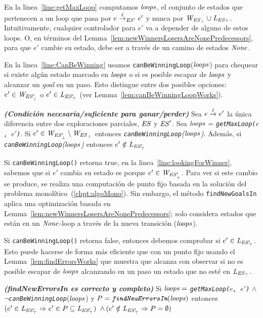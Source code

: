 En la linea~\ref{line:getMaxLoop} computamos $\mathit{loops}$, el conjunto de estados que pertenecen a un loop que pasa por $e \overset{\ell}{\rightarrow}_{\mathit{ES}'} e'$ y nunca por $\mathit{W_{\mathit{\mathit{ES}_{\bot}}}} \cup \mathit{L_{\mathit{\mathit{ES}_{\top}}}}$. 
Intuitivamente, cualquier controlador para $e'$ va a depender de alguno de estos loops. O, en términos del Lemma~\ref{lem:newWinnersLosersAreNonePredecessors}, para que $e'$ cambie su estado, debe ser a través de un camino de estados $\mathit{None}$. 

En la linea~\ref{line:CanBeWinning} usamos \texttt{canBeWinningLoop}($\mathit{loops}$) para chequear si existe algún estado marcado en $\mathit{loops}$ o si es posible escapar de $\mathit{loops}$ y alcanzar un \textit{goal} en un paso. Esto distingue entre dos posibles opciones: $e' \in \mathit{W_{\mathit{\mathit{ES}'_{\bot}}}}$ o $e' \in \mathit{L_{\mathit{\mathit{ES}'_{\top}}}}$ (ver 
Lemma~\ref{lem:canBeWinningLoopWorks}). 

\begin{lemma}\textbf{\emph{(Condición necesaria/suficiente para ganar/perder)}}
\label{lem:canBeWinningLoopWorks}
Sea $e \overset{\ell}{\rightarrow}_{} e'$ la única diferencia entre dos exploraciones parciales, 
$\mathit{ES}$ y $\mathit{ES}'$. Sea $\mathit{loops}$ = \emph{\texttt{getMaxLoop($e$, 
$e'$)}}.
Si $e' \in \mathit{W_{\mathit{\mathit{ES}'_{\bot}}}} \setminus \mathit{W_{\mathit{\mathit{ES}_{\bot}}}}$ 
entonces \emph{\texttt{canBeWinningLoop}($\mathit{loops}$)}. Además, si \\ 
\emph{\texttt{canBeWinningLoop}($\mathit{loops}$)} entonces $e' \notin \mathit{L_{\mathit{\mathit{ES}'_{\top}}}}$ 
\end{lemma}


Si \texttt{canBeWinningLoop()} retorna true, en la  linea~\ref{line:lookingForWinner}, 
sabemos que si $e'$ cambia su estado es porque $e' \in \mathit{W_{\mathit{\mathit{ES}'_{\bot}}}}$. Para ver si este cambio se produce, se realiza una computación de punto fijo basada en la solución del problema monolítico~(\ref{chpt:algoMono}). 
Sin embargo, el método \texttt{findNewGoalsIn} aplica una optimización basada en Lemma~\ref{lem:newWinnersLosersAreNonePredecessors}; solo considera estados que están en un $\mathit{None}$-loop a través de la nueva transición ($\mathit{loops}$).

Si \texttt{canBeWinningLoop()} retorna false, entonces debemos comprobar si $e' \in \mathit{L_{\mathit{\mathit{ES}'_{\top}}}}$.
Esto puede hacerse de forma más eficiente que con un punto fijo usando el Lemma~\ref{lem:findErrorsWorks} que muestra que alcanza con observar si no es posible escapar de $\mathit{loops}$ alcanzando en un paso un estado que no esté en $\mathit{L_{\mathit{\mathit{ES}_{\top}}}}$. 



\begin{lemma}\textbf{\emph{(findNewErrorsIn es correcto y completo)}}
\label{lem:findErrorsWorks}
Si $\mathit{loops} =$ \emph{\texttt{getMaxLoop($e$, $e'$)}} $\wedge$
$\neg$\emph{\texttt{canBeWinningLoop}}($\mathit{loops}$) y 
$P=\emph{\texttt{findNewErrorsIn}}(\mathit{loops})$ entonces 
$(e' \in \mathit{L_{\mathit{\mathit{ES}'_{\top}}}} \Rightarrow e' \in P 
\subseteq \mathit{L_{\mathit{\mathit{ES}'_{\top}}}})$ $\wedge \, (e' \notin \mathit{L_{\mathit{\mathit{ES}'_{\top}}}} \Rightarrow P = 
\emptyset)$
\end{lemma}



